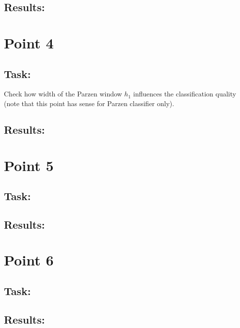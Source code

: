 \documentclass[
  a4paper,            %
  DIV=10,             %
  oneside,            %
  BCOR=5mm,           %
  parskip=half,       %
  numbers=noenddot,   %
  bibtotoc,           %
  listof=totoc        %
]{scrreprt}
\begin{document}
\subsection*{Results:}

\section*{Point 4}
\subsection*{Task:}
Check how width of the Parzen window $h_{1}$ influences the classification quality (note that this point has sense for Parzen classifier only).
\subsection*{Results:}

\section*{Point 5}
\subsection*{Task:}
\subsection*{Results:}

\section*{Point 6}
\subsection*{Task:}
\subsection*{Results:}
\end{document}
